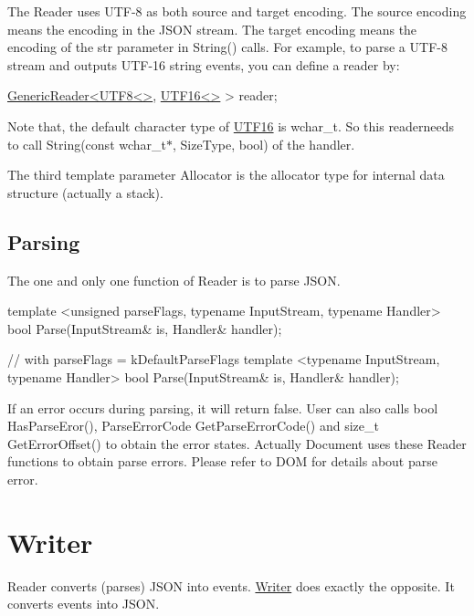 The {\ttfamily Reader} uses U\+T\+F-\/8 as both source and target encoding. The source encoding means the encoding in the J\+S\+ON stream. The target encoding means the encoding of the {\ttfamily str} parameter in {\ttfamily String()} calls. For example, to parse a U\+T\+F-\/8 stream and outputs U\+T\+F-\/16 string events, you can define a reader by\+:


\begin{DoxyCode}
\hyperlink{class_generic_reader}{GenericReader<UTF8<>}, \hyperlink{struct_u_t_f16}{UTF16<>} > reader;
\end{DoxyCode}


Note that, the default character type of {\ttfamily \hyperlink{struct_u_t_f16}{U\+T\+F16}} is {\ttfamily wchar\+\_\+t}. So this {\ttfamily reader}needs to call {\ttfamily String(const wchar\+\_\+t$\ast$, Size\+Type, bool)} of the handler.

The third template parameter {\ttfamily Allocator} is the allocator type for internal data structure (actually a stack).\hypertarget{md_Commun_Externe_RapidJSON_doc_sax.zh-cn_Parsing}{}\subsection{Parsing}\label{md_Commun_Externe_RapidJSON_doc_sax.zh-cn_Parsing}
The one and only one function of {\ttfamily Reader} is to parse J\+S\+ON.


\begin{DoxyCode}
\textcolor{keyword}{template} <\textcolor{keywordtype}{unsigned} parseFlags, \textcolor{keyword}{typename} InputStream, \textcolor{keyword}{typename} Handler>
\textcolor{keywordtype}{bool} Parse(InputStream& is, Handler& handler);

\textcolor{comment}{// with parseFlags = kDefaultParseFlags}
\textcolor{keyword}{template} <\textcolor{keyword}{typename} InputStream, \textcolor{keyword}{typename} Handler>
\textcolor{keywordtype}{bool} Parse(InputStream& is, Handler& handler);
\end{DoxyCode}


If an error occurs during parsing, it will return {\ttfamily false}. User can also calls {\ttfamily bool Has\+Parse\+Eror()}, {\ttfamily Parse\+Error\+Code Get\+Parse\+Error\+Code()} and {\ttfamily size\+\_\+t Get\+Error\+Offset()} to obtain the error states. Actually {\ttfamily Document} uses these {\ttfamily Reader} functions to obtain parse errors. Please refer to D\+OM for details about parse error.\hypertarget{md_Commun_Externe_RapidJSON_doc_sax.zh-cn_Writer}{}\section{Writer}\label{md_Commun_Externe_RapidJSON_doc_sax.zh-cn_Writer}
{\ttfamily Reader} converts (parses) J\+S\+ON into events. {\ttfamily \hyperlink{class_writer}{Writer}} does exactly the opposite. It converts events into J\+S\+ON.

